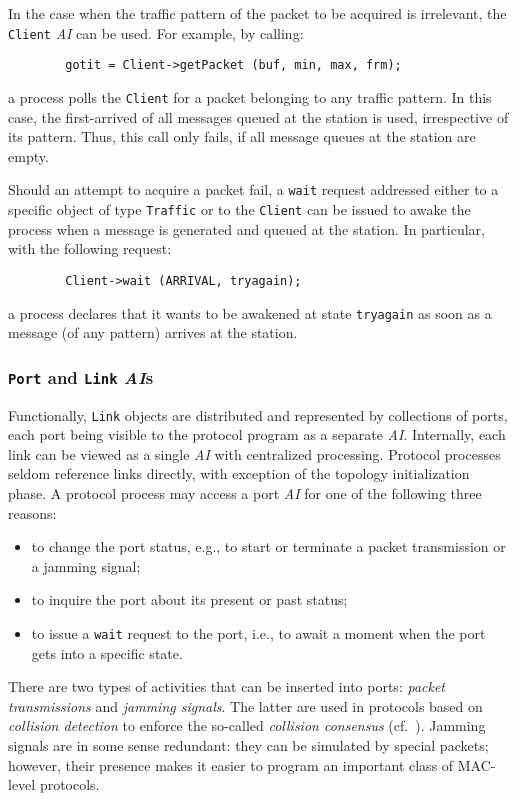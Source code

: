 In the case when the traffic pattern of the packet to be acquired is
irrelevant, the {\tt Client} {\em AI\/} can be used.
For example, by calling:
{\small
\begin{verbatim}
        gotit = Client->getPacket (buf, min, max, frm);
\end{verbatim} }
\noindent
a process polls the {\tt Client}
for a packet belonging to any traffic pattern.
In this case, the first-arrived of all messages queued at the station
is used, irrespective of its pattern.
Thus, this call only fails, if all message queues at the station are empty.

Should an attempt to acquire a packet fail, a {\tt wait} request addressed
either to a specific object of type {\tt Traffic} or to the {\tt Client}
can be issued to awake the process when a message is generated and queued
at the station.
In particular, with the following request:
{\small
\begin{verbatim}
        Client->wait (ARRIVAL, tryagain);
\end{verbatim} }
\noindent
a process declares that it
wants to be awakened at state {\tt tryagain} as soon as a message
(of any pattern) arrives at the station.

\subsubsection{{\tt Port} and {\tt Link} {\em AI\/}s}

Functionally, {\tt Link} objects are distributed and
represented by collections of ports, each port being visible to the
protocol program as a separate {\em AI}.
Internally,
each link can be viewed as a single {\em AI\/} with centralized
processing.
Protocol processes seldom reference links directly, with exception of the
topology initialization phase.
A protocol process may access a port {\em AI\/} for one of the following
three reasons:
\begin{itemize}
\item
to change the port status, e.g.,
to start or terminate a packet transmission or a jamming signal;
\item
to inquire the port about its present or past status;
\item
to issue a {\tt wait} request to the port, i.e.,
to await a moment when the port gets into a specific state.
\end{itemize}

There are two types of activities that can be inserted into ports:
{\em packet transmissions\/} and {\em jamming signals}.
The latter are used in protocols based on {\em collision detection\/} to
enforce the so-called {\em collision consensus} (cf.\ 
\cite{meb76}).
Jamming signals are in some sense redundant: they can be simulated by special
packets; however, their presence makes it easier to program an important class
of MAC-level protocols.

